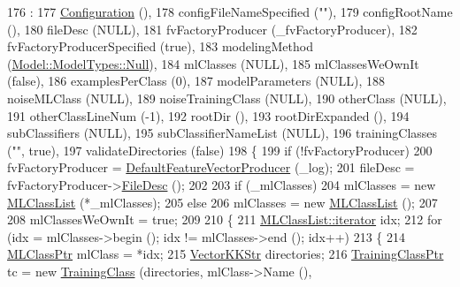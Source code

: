 \begin{DoxyCode}
176                                                 :
177   \hyperlink{class_k_k_b_1_1_configuration_a779947337bf652f0e773cb29f37f14ba}{Configuration}              (),
178   configFileNameSpecified    (\textcolor{stringliteral}{""}),
179   configRootName             (),
180   fileDesc                   (NULL),
181   fvFactoryProducer          (\_fvFactoryProducer),
182   fvFactoryProducerSpecified (\textcolor{keyword}{true}),
183   modelingMethod             (\hyperlink{class_k_k_m_l_l_1_1_model_aeda4060e088c67446ca993eefcecea06abbb93ef26e3c101ff11cdd21cab08a94}{Model::ModelTypes::Null}),
184   mlClasses                  (NULL),
185   mlClassesWeOwnIt           (\textcolor{keyword}{false}),
186   examplesPerClass           (0),
187   modelParameters            (NULL),
188   noiseMLClass               (NULL),
189   noiseTrainingClass         (NULL),
190   otherClass                 (NULL),
191   otherClassLineNum          (-1),
192   rootDir                    (),
193   rootDirExpanded            (),
194   subClassifiers             (NULL),
195   subClassifierNameList      (NULL),
196   trainingClasses            (\textcolor{stringliteral}{""}, \textcolor{keyword}{true}),
197   validateDirectories        (\textcolor{keyword}{false})
198 \{
199   \textcolor{keywordflow}{if}  (!fvFactoryProducer)
200     fvFactoryProducer =  \hyperlink{class_k_k_m_l_l_1_1_training_configuration2_a90fd82a6c680ea2a5dd8f5dcd75a8bb7}{DefaultFeatureVectorProducer} (\_log);
201   fileDesc = fvFactoryProducer->\hyperlink{class_k_k_m_l_l_1_1_factory_f_v_producer_ab2dea2e51cf9d6a109b52300619e185c}{FileDesc} ();
202 
203   \textcolor{keywordflow}{if}  (\_mlClasses)
204     mlClasses = \textcolor{keyword}{new} \hyperlink{class_k_k_m_l_l_1_1_m_l_class_list}{MLClassList} (*\_mlClasses);
205   \textcolor{keywordflow}{else}
206     mlClasses = \textcolor{keyword}{new} \hyperlink{class_k_k_m_l_l_1_1_m_l_class_list}{MLClassList} ();
207 
208   mlClassesWeOwnIt = \textcolor{keyword}{true};
209 
210   \{
211     \hyperlink{class_k_k_b_1_1_k_k_queue_aa3c2796a726eea468b94132a9fbf2cfe}{MLClassList::iterator} idx;
212     \textcolor{keywordflow}{for}  (idx = mlClasses->begin ();  idx != mlClasses->end ();  idx++)
213     \{
214       \hyperlink{class_k_k_m_l_l_1_1_m_l_class}{MLClassPtr} mlClass = *idx;
215       \hyperlink{class_k_k_b_1_1_vector_k_k_str}{VectorKKStr}  directories;
216       \hyperlink{class_k_k_m_l_l_1_1_training_class}{TrainingClassPtr}  tc = \textcolor{keyword}{new} \hyperlink{class_k_k_m_l_l_1_1_training_class}{TrainingClass} (directories, mlClass->Name (),

\end{DoxyCode}
